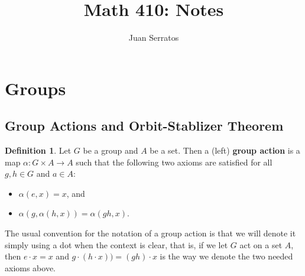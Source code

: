 \documentclass[9pt,reqno]{amsart}
\title{Math 410: Notes }
\author{Juan Serratos}
\theoremstyle{definition}
\newtheorem{defi}{Definition}[section]
\begin{document}
\maketitle
\tableofcontents
\newpage
\section{Groups}
\subsection{Group Actions and Orbit-Stablizer Theorem}
\begin{defi}
Let $G$ be a group and $A$ be a set. Then a (left) \textbf{group action} is a map $\alpha \colon G \times A \to A$ such that the following two axioms are satisfied for all $g, h \in G$ and $a \in A$:
\begin{itemize}
	\item $\alpha (e, x) = x $, and
	\item $\alpha (g, \alpha (h, x)) = \alpha (gh, x)$.
\end{itemize}	
\end{defi}
The usual convention for the notation of a group action is that we will denote it simply using a dot when the context is clear, that is, if we let $G$ act on a set $A$, then $e \cdot x  = x$ and $ g \cdot (h \cdot x)) = (gh) \cdot x$ is the way we denote the two needed axioms above. 
\end{document}
